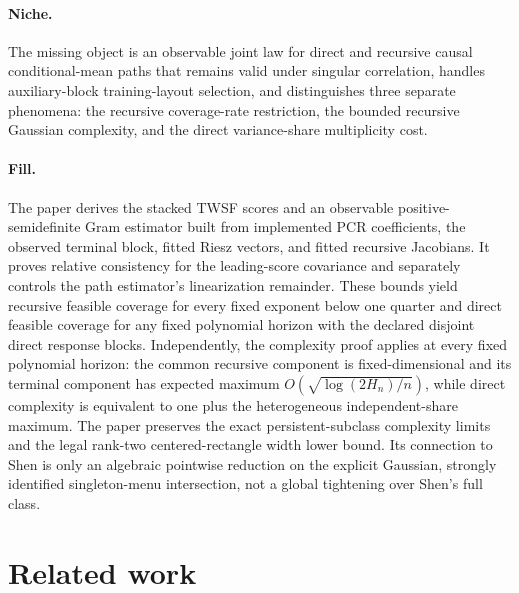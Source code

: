 \documentclass{article}
\begin{document}
\paragraph{Niche.} The missing object is an observable joint law for direct and recursive causal conditional-mean paths that remains valid under singular correlation, handles auxiliary-block training-layout selection, and distinguishes three separate phenomena: the recursive coverage-rate restriction, the bounded recursive Gaussian complexity, and the direct variance-share multiplicity cost.

\paragraph{Fill.} The paper derives the stacked TWSF scores and an observable positive-semidefinite Gram estimator built from implemented PCR coefficients, the observed terminal block, fitted Riesz vectors, and fitted recursive Jacobians. It proves relative consistency for the leading-score covariance and separately controls the path estimator's linearization remainder. These bounds yield recursive feasible coverage for every fixed exponent below one quarter and direct feasible coverage for any fixed polynomial horizon with the declared disjoint direct response blocks. Independently, the complexity proof applies at every fixed polynomial horizon: the common recursive component is fixed-dimensional and its terminal component has expected maximum \(O(\sqrt{\log(2H_n)/n})\), while direct complexity is equivalent to one plus the heterogeneous independent-share maximum. The paper preserves the exact persistent-subclass complexity limits and the legal rank-two centered-rectangle width lower bound. Its connection to Shen is only an algebraic pointwise reduction on the explicit Gaussian, strongly identified singleton-menu intersection, not a global tightening over Shen's full class.

\section{Related work}
\end{document}
